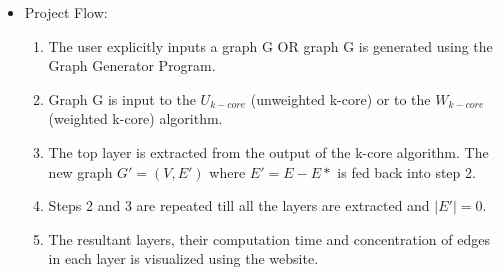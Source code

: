 \begin{itemize} 
\item{Project Flow: }
    \begin{enumerate}
        \item The user explicitly inputs a graph G OR graph G is generated using the Graph Generator Program.
        \item Graph G is input to the $U_{k-core}$ (unweighted k-core) or to the $W_{k-core}$ (weighted k-core) algorithm.
        \item The top layer is extracted from the output of the k-core algorithm. The new graph $G' = (V,E')$ where $E' = E-E*$ is fed back into step 2.
        \item Steps 2 and 3 are repeated till all the layers are extracted and $|E'| = 0$.
        \item The resultant layers, their computation time and concentration of edges in each layer is visualized using the website. 
    \end{enumerate}

\end{itemize}

